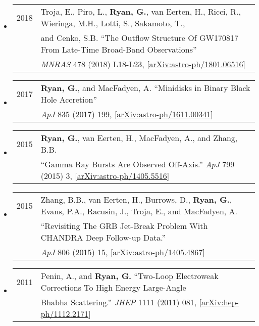 \begin{itemize}
\item \begin{tabular}{ll}
2018 & Troja, E., Piro, L., {\bf Ryan, G.}, van Eerten, H., Ricci, R., Wieringa, M.H., Lotti, S., Sakamoto, T.,\\
	& and Cenko, S.B. ``The Outflow Structure Of GW170817 From Late-Time Broad-Band Observations'' \\
	& \emph{MNRAS} 478 (2018) L18-L23, [\href{https://arxiv.org/abs/1801.06516}{arXiv:astro-ph/1801.06516}]
\end{tabular}

\item \begin{tabular}{ll}
2017 & {\bf Ryan, G.}, and MacFadyen, A. ``Minidisks in Binary Black Hole Accretion'' \\ 
	& \emph{ApJ} 835 (2017) 199, [\href{https://arxiv.org/abs/1611.00341}{arXiv:astro-ph/1611.00341}]
\end{tabular}

\item \begin{tabular}{ll}
2015 & {\bf Ryan, G.}, van Eerten, H., MacFadyen, A., and Zhang, B.B. \\ 
	& ``Gamma Ray Bursts Are Observed Off-Axis.''  \emph{ApJ} 799 (2015) 3, [\href{https://arxiv.org/abs/1405.5516}{arXiv:astro-ph/1405.5516}] \\
\end{tabular}

\item \begin{tabular}{ll}
2015 & Zhang, B.B., van Eerten, H., Burrows, D., {\bf Ryan, G.}, {Evans}, P.A., Racusin, J., Troja, E., and MacFadyen, A. \\
 & ``Revisiting The GRB Jet-Break Problem With CHANDRA Deep Follow-up Data.''  \\
&  \emph{ApJ} 806 (2015) 15, [\href{https://arxiv.org/abs/1405.4867}{arXiv:astro-ph/1405.4867}] \\
\end{tabular}

\item \begin{tabular}{ll}
2011 & Penin, A., and {\bf Ryan, G.}  ``Two-Loop Electroweak Corrections To High Energy Large-Angle \\& Bhabha Scattering.'' \emph{JHEP} 1111 (2011) 081, [\href{https://arxiv.org/abs/1112.2171}{arXiv:hep-ph/1112.2171}] \\
\end{tabular}
\end{itemize}

